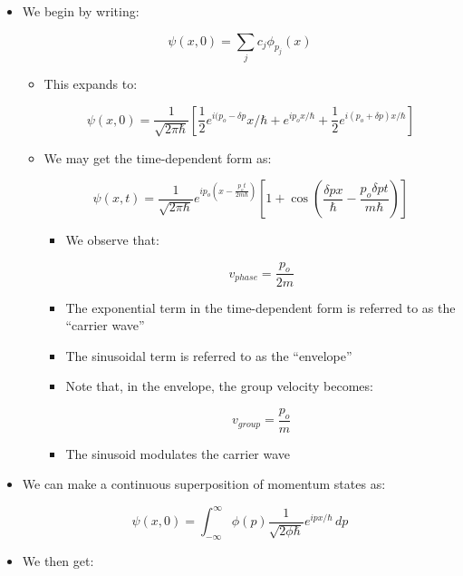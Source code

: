 \begin{itemize}
\begin{itemize}
\begin{itemize}
        \end{itemize}

      \item We begin by writing:

        $$\psi(x,0)=\sum_{j}c_j\phi_{p_j}(x)$$

        \begin{itemize}

          \item This expands to:

            $$\psi(x,0)=\frac{1}{\sqrt{2\pi\hbar}}\left[ \frac{1}{2}e^{i(p_o-\delta p}x/\hbar+e^{ip_ox/\hbar}+\frac{1}{2}e^{i(p_o+\delta p)x/\hbar} \right]$$
          \item We may get the time-dependent form as:

            $$\psi(x,t)=\frac{1}{\sqrt{2\pi\hbar}}e^{ip_o\left( x-\frac{p_ot}{2m\hbar} \right)}\left[ 1+\cos\left( \frac{\delta p x}{\hbar}-\frac{p_o\delta pt}{m\hbar} \right) \right]$$

            \begin{itemize}

              \item We observe that:

                $$v_{phase}=\frac{p_o}{2m}$$

              \item The exponential term in the time-dependent form is referred to as the ``carrier wave''

              \item The sinusoidal term is referred to as the ``envelope''

              \item Note that, in the envelope, the group velocity becomes:

                $$v_{group}=\frac{p_o}{m}$$

              \item The sinusoid modulates the carrier wave

            \end{itemize}

        \end{itemize}

      \item We can make a continuous superposition of momentum states as:

        $$\psi(x,0)=\int_{-\infty}^{\infty}\phi(p)\frac{1}{\sqrt{2\phi\hbar}}e^{ipx/\hbar}\,dp$$

      \item We then get:


\end{itemize}
\end{itemize}
